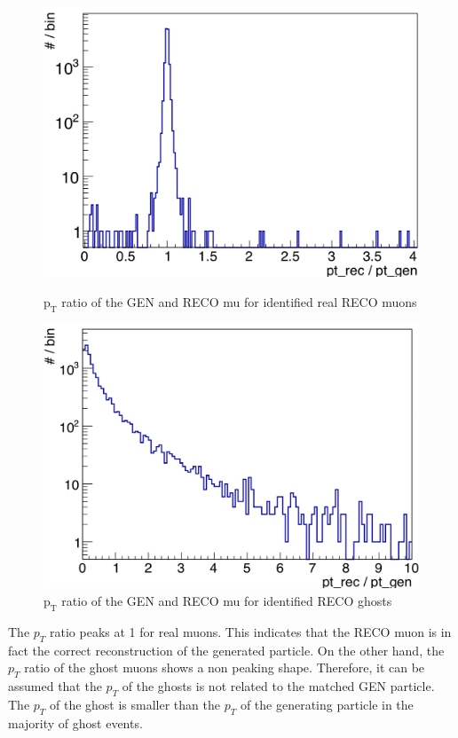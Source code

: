 \begin{figure}[b]
\centering
\begin{minipage}[t]{0.475\textwidth}
\includegraphics[width=\textwidth]{Figures/scheuch/ptRatioRealMu.png}
\caption{$\mathrm{p_{T}}$ ratio of the GEN and RECO mu for identified real RECO muons}
\label{PtRatioReal}
\end{minipage}
\hspace{0.5cm}
\begin{minipage}[t]{0.475\textwidth}
\includegraphics[width=\textwidth]{Figures/scheuch/ptRatioGhosts.png}
\caption{$\mathrm{p_{T}}$ ratio of the GEN and RECO mu for identified RECO ghosts}
\label{PtRatioGhost}
\end{minipage}
\end{figure}
The $p_{T}$ ratio peaks at 1 for real muons. This indicates that the RECO muon is in fact the correct reconstruction of the generated particle. On the other hand, the $p_{T}$ ratio of the ghost muons shows a non peaking shape. Therefore, it can be assumed that the $p_{T}$ of the ghosts is not related to the matched GEN particle. The $p_{T}$ of the ghost is smaller than the $p_{T}$ of the generating particle in the majority of ghost events.\\
